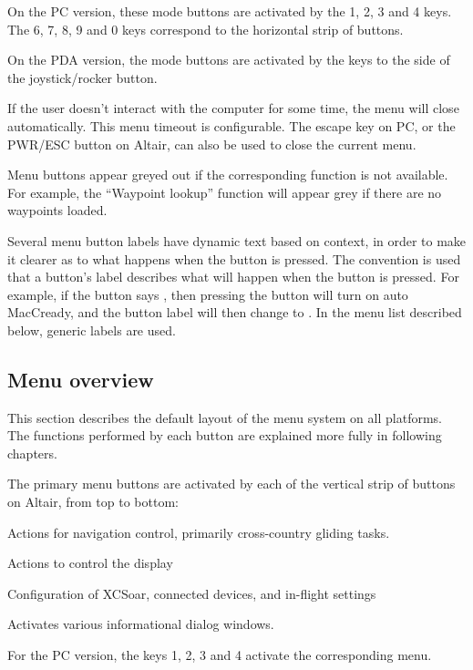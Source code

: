 \documentclass[a4paper,12pt]{refrep}
\begin{document}
On the PC version, these mode buttons are activated by the
1, 2, 3 and 4 keys.  The 6, 7, 8, 9 and 0 keys correspond to the horizontal
strip of buttons.

On the PDA version, the mode buttons are activated by the keys to the
side of the joystick/rocker button.

If the user doesn't interact with the computer for some time, the
menu will close automatically.  This menu timeout is configurable.
The escape key on PC, or the PWR/ESC button on Altair, can
also be used to close the current menu.

Menu buttons appear greyed out if the corresponding function is not available. 
For example, the ``Waypoint lookup'' function will appear grey if there are no waypoints loaded.

Several menu button labels have dynamic text based on context, in
order to make it clearer as to what happens when the button is
pressed.  The convention is used that a button's label describes what
will happen when the button is pressed.  For example, if the button
says , then pressing the button will turn on auto
MacCready, and the button label will then change to . 
In the menu list described below, generic labels are used.

\subsection*{Menu overview}
This section describes the default layout of the menu system on all
platforms.  The functions performed by each button are explained more
fully in following chapters.

The primary menu buttons are activated by each of the vertical strip of buttons
on Altair, from top to bottom:
\begin{jspecs}
\item[\bmenu{Nav}] Actions for navigation control, primarily cross-country
gliding tasks.
\item[\bmenu{Display}] Actions to control the display
\item[\bmenu{Config}] Configuration of XCSoar, connected devices, and in-flight
settings
\item[\bmenu{Info}] Activates various informational dialog windows.
\end{jspecs}

For the PC version, the keys 1, 2, 3 and 4 activate the 
corresponding menu.
\end{document}
